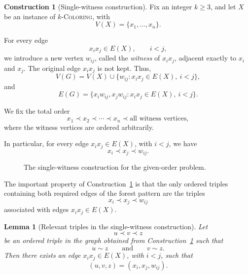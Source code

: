 \documentclass[12pt]{article}
\theoremstyle{plain}
\newtheorem{lemma}[theorem]{Lemma}
\theoremstyle{definition}
\theoremstyle{remark}
\theoremstyle{definition}
\newtheorem{construction}[theorem]{Construction}
\begin{document}
\begin{construction}[Single-witness construction]
\label{constr:for-given-order}
Fix an integer \(k\ge 3\), and let \(X\) be an instance of
\(k\)-\textsc{Coloring}, with
\[
V(X)=\{x_1,\dots,x_n\}.
\]

For every edge
\[
x_ix_j\in E(X),
\qquad i<j,
\]
we introduce a new vertex \(w_{ij}\), called the \emph{witness} of
\(x_ix_j\), adjacent exactly to \(x_i\) and \(x_j\). The original edge
\(x_ix_j\) is not kept. Thus,
\[
V(G)
=
V(X)\cup
\{w_{ij}:x_ix_j\in E(X),\ i<j\},
\]
and
\[
E(G)
=
\{x_iw_{ij},x_jw_{ij}:
x_ix_j\in E(X),\ i<j\}.
\]

We fix the total order
\[
x_1\prec x_2\prec\cdots\prec x_n
\prec
\text{all witness vertices},
\]
where the witness vertices are ordered arbitrarily.

In particular, for every edge \(x_ix_j\in E(X)\), with \(i<j\), we have
\[
x_i\prec x_j\prec w_{ij}.
\]
\end{construction}

\begin{figure}[h]
\centering
{}
\caption{The single-witness construction for the given-order problem.}
\label{fig:for-given-order-construction}
\end{figure}

The important property of
Construction~\ref{constr:for-given-order} is that the only ordered triples
containing both required edges of the forest pattern are the triples
\[
x_i\prec x_j\prec w_{ij}
\]
associated with edges \(x_ix_j\in E(X)\).









\begin{lemma}[Relevant triples in the single-witness construction]
\label{lem:for-given-order-relevant-triples}
Let
\[
u\prec v\prec z
\]
be an ordered triple in the graph obtained from
Construction~\ref{constr:for-given-order} such that
\[
u\sim z
\qquad\text{and}\qquad
v\sim z.
\]
Then there exists an edge \(x_ix_j\in E(X)\), with \(i<j\), such that
\[
(u,v,z)=(x_i,x_j,w_{ij}).
\]
\end{lemma}
\end{document}
